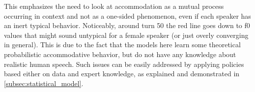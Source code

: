 This emphasizes the need to look at accommodation as a mutual process occurring in context and not as a one-sided phenomenon, even if each speaker has an inert typical behavior.
Noticeably, around turn 50 the red line goes down to \ac{f0} values that might sound untypical for a female speaker (or just overly converging in general).
This is due to the fact that the models here learn some theoretical probabilistic accommodative behavior, but do not have any knowledge about realistic human speech.
Such issues can be easily addressed by applying policies based either on data and expert knowledge, as explained and demonstrated in \cref{subsec:statistical_model}.